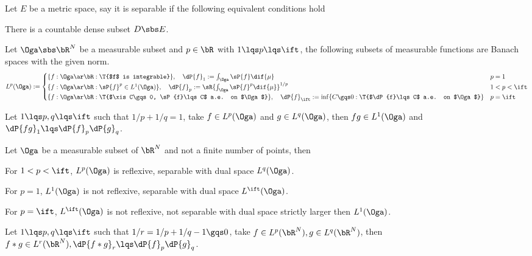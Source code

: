 \documentclass[a4paper, twoside]{article}
\begin{document}
\begin{dfn}
    Let $E$ be a metric space, say it is separable if the following equivalent conditions hold
    \begin{enr}[label=(\arabic*)]
        \item There is a countable dense subset $D\sbs E$.
    \end{enr}
\end{dfn}


\begin{dfn}
    Let $\Oga\sbs\bR^{N}$ be a measurable subset and $p\in\bR$ with $1\lqs p\lqs\ift$, the following subsets of measurable functions are Banach spaces with the given norm.
    \[
        L^{p}(\Oga):=\begin{cases}
          \{f:\Oga\ar\bR: \T{$f$ is integrable}\},\quad \dP{f}_{1}:=\int_{\Oga}\sP{f}\dif{\mu} & p=1 \\
          \{f:\Oga\ar\bR: \sP{f}^{p}\in L^{1}(\Oga)\},\quad \dP{f}_{p}:=\sR{\int_{\Oga}\sP{f}^{p}\dif{\mu}}^{1/p} & 1<p<\ift \\
          \{f:\Oga\ar\bR:\T{$\xis C\gqs0, \sP{f}\lqs C$ a.e. on $\Oga$}\},\quad \dP{f}_{\ift}:=\inf\{C\gqs0:\T{$\dP{f}\lqs C$ a.e. on $\Oga$}\}& p=\ift
        \end{cases}
    \]
\end{dfn}

\begin{thm}
    Let $1\lqs p,q\lqs\ift$ such that $1/p+1/q=1$, take $f\in L^{p}(\Oga)$ and $g\in L^{q}(\Oga)$, then $fg\in L^{1}(\Oga)$ and $\dP{fg}_{1}\lqs\dP{f}_{p}\dP{g}_{q}$.
\end{thm}


\begin{thm}
    Let $\Oga$ be a measurable subset of $\bR^{N}$ and not a finite number of points, then
    \begin{enr}[label=(\arabic*)]
        \item For $1<p<\ift$, $L^{p}(\Oga)$ is reflexive, separable with dual space $L^{q}(\Oga)$.
        \item For $p=1$, $L^{1}(\Oga)$ is not reflexive, separable with dual space $L^{\ift}(\Oga)$.
        \item For $p=\ift$, $L^{\ift}(\Oga)$ is not reflexive, not separable with dual space strictly larger then $L^{1}(\Oga)$.
    \end{enr}
\end{thm}


\begin{thm}
    Let $1\lqs p,q\lqs\ift$ such that $1/r=1/p+1/q-1\gqs0$, take $f\in L^{p}(\bR^{N}),g\in L^{q}(\bR^{N})$, then $f\ast g\in L^{r}(\bR^{N}),\dP{f\ast g}_{r}\lqs \dP{f}_{p}\dP{g}_{q}$.
\end{thm}
\end{document}
